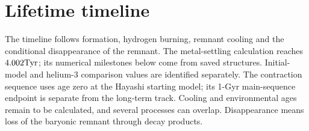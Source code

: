 \clearpage

\section{Lifetime timeline}
\label{sec:lifetime}
The timeline follows formation, hydrogen burning, remnant cooling and the
conditional disappearance of the remnant. The metal-settling calculation
reaches $4.002\mathrm{Tyr}$; its numerical milestones below come from saved
structures. Initial-model and helium-3 comparison values are identified
separately. The contraction sequence uses age zero at the Hayashi starting model;
its 1-Gyr main-sequence endpoint is separate from the long-term track. Cooling and environmental ages
remain to be calculated, and several processes can overlap.
Disappearance means loss of the baryonic remnant through decay products.

